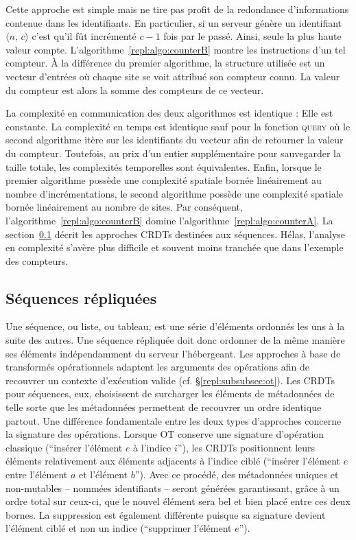 Cette approche est simple mais ne tire pas profit de la redondance
d'informations contenue dans les identifiants. En particulier, si un serveur
génère un identifiant $\langle n,\, c\rangle$ c'est qu'il fût incrémenté $c-1$
fois par le passé. Ainsi, seule la plus haute valeur
compte. L'algorithme~\ref{repl:algo:counterB} montre les instructions d'un tel
compteur. À la différence du premier algorithme, la structure utilisée est un
vecteur d'entrées où chaque site se voit attribué son compteur connu. La valeur
du compteur est alors la somme des compteurs de ce vecteur.

La complexité en communication des deux algorithmes est identique : Elle est
constante. La complexité en temps est identique sauf pour la fonction
\textsc{query} où le second algorithme itère sur les identifiants du vecteur
afin de retourner la valeur du compteur. Toutefois, au prix d'un entier
supplémentaire pour sauvegarder la taille totale, les complexités temporelles
sont équivalentes. Enfin, lorsque le premier algorithme possède une complexité
spatiale bornée linéairement au nombre d'incrémentations, le second algorithme
possède une complexité spatiale bornée linéairement au nombre de sites. Par
conséquent, l'algorithme~\ref{repl:algo:counterB} domine
l'algorithme~\ref{repl:algo:counterA}. La section~\ref{repl:subsec:sequences}
décrit les approches CRDTs destinées aux séquences. Hélas, l'analyse en
complexité s'avère plus difficile et souvent moins tranchée que dans l'exemple
des compteurs.


\subsection{Séquences répliquées}
\label{repl:subsec:sequences}

Une séquence, ou liste, ou tableau, est une série d'éléments ordonnés les uns à
la suite des autres. Une séquence répliquée doit donc ordonner de la même
manière ses éléments indépendamment du serveur l'hébergeant. Les approches à
base de transformés opérationnels adaptent les arguments des opérations afin de
recouvrer un contexte d'exécution valide (cf. §\ref{repl:subsubsec:ot}). Les
CRDTs pour séquences, eux, choisissent de surcharger les éléments de métadonnées
de telle sorte que les métadonnées permettent de recouvrer un ordre identique
partout. Une différence fondamentale entre les deux types d'approches concerne
la signature des opérations. Lorsque OT conserve une signature d'opération
classique (``insérer l'élément $e$ à l'indice $i$''), les CRDTs positionnent
leurs éléments relativement aux éléments adjacents à l'indice ciblé (``insérer
l'élément $e$ entre l'élément $a$ et l'élément $b$''). Avec ce procédé, des
métadonnées uniques et non-mutables -- nommées identifiants -- seront générées
garantissant, grâce à un ordre total sur ceux-ci, que le nouvel élément sera bel
et bien placé entre ces deux bornes. La suppression est également différente
puisque sa signature devient l'élément ciblé et non un indice (``supprimer
l'élément $e$'').

